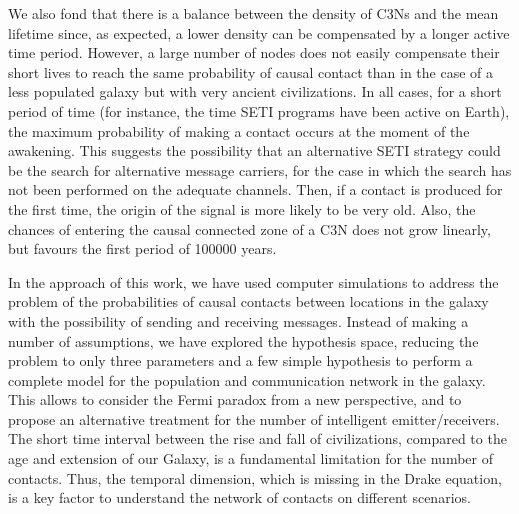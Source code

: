 \documentclass[crop]{CSLB}
\newcommand{\ceti}{C3N}
\newcommand{\cetis}{C3Ns}
\begin{document}
We also fond that there 
is a balance between the density of \cetis{} and the mean
lifetime since, as expected, a lower density can be compensated by a
longer active time period.
%
However, a large number of nodes does not easily compensate their
short lives to reach the same probability of causal contact than in
the case of a less populated galaxy but with very ancient
civilizations.
%
In all cases, for a short period of time (for instance, the time SETI
programs have been active on Earth), the maximum probability of making
a contact occurs at the moment of the awakening.
%
This suggests the possibility that an alternative SETI strategy could
be the search for alternative message carriers, for the case in which
the search has not been performed on the adequate channels.
%
Then, if a contact is produced for the first time, the origin of the
signal is more likely to be very old.
%
Also, the chances of entering the causal connected zone of a \ceti{}
does not grow linearly, but favours the first period of 100000 years.


In the approach of this work, we have used computer simulations to address
the problem of the probabilities of causal contacts between locations
in the galaxy with the possibility of sending and receiving messages.
%
Instead of making a number of assumptions, we have explored the
hypothesis space, reducing the problem to only three parameters and a
few simple hypothesis to perform a complete model for the population and
communication network in the galaxy.
%
This allows to consider the Fermi paradox from a new perspective, and
to propose an alternative treatment for the number of intelligent
emitter/receivers.
%
The short time interval between the
rise and fall of civilizations, compared to the age and extension of
our Galaxy, is a fundamental limitation for the number of contacts.
%
Thus, the temporal dimension, which is missing in the Drake
equation, is a key factor to understand the network of contacts on
different scenarios.





\setlength{\bibsep}{0.0pt}

\end{document}

